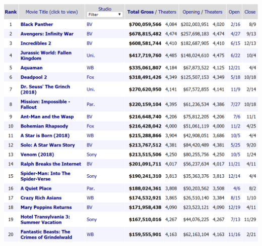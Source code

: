 \documentclass[12pt]{article}
\begin{document}
\vspace{1cm}
\includegraphics[width=\textwidth]{imgtopfilms.png}
\end{document}
